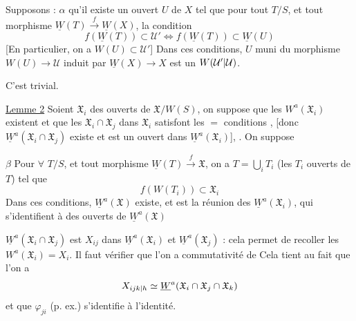 Supposons : \textcircled{$\alpha$} qu'il existe un ouvert $U$ de $X$ tel que pour tout $T/S$, et tout morphisme $\underline W(T)\xrightarrow{f}\underline W(X)$, la condition
\[
f(\underline W(T))\subset\mathcal U'\Longleftrightarrow f(\underline W(T))\subset\underline W(U)
\]
[En particulier, on a $W(U)\subset\mathcal U'$]
Dans ces conditions, $U$ muni du morphisme $W(U)\to\mathcal U$ induit par $\underline W(X)\to X$ est un $W(\mathcal U'|\mathcal U)$.

C'est trivial.


\uline{Lemme 2} Soient $\mathfrak X_i$ des ouverts de $\mathfrak X/W(S)$, on suppose  que  les $W^a(\mathfrak X_i)$ existent  \deleted{)} et que les $\mathfrak X_i\cap\mathfrak X_j$ dans $\mathfrak X_i$ satisfont les $=$ conditions , [donc $\underline W^a(\mathfrak X_i\cap\mathfrak X_j)$ existe\unsure{\}} et est un ouvert dans $\underline W^a(\mathfrak X_i)$], . On suppose

\textcircled{$\beta$} Pour $\forall$ $T/S$, et tout morphisme $\underline W(T)\xrightarrow{f}\mathfrak X$, on a $T=\bigcup_i T_i$ (les $T_i$ ouverts de $T$) tel que
\[
f(W(T_i))\subset\mathfrak X_i
\]
Dans ces conditions, $\underline W^a(\mathfrak X)$ existe, et est la réunion des $\underline W^a(\mathfrak X_i)$, qui s'identifient à des ouverts de $\underline W^a(\mathfrak X)$

$\underline W^a(\mathfrak X_i\cap\mathfrak X_j)$ est     $X_{ij}$ dans $\underline W^a(\mathfrak X_i)$ et  $\underline W^a(\mathfrak X_j)$ : cela permet de recoller les $W^a(\mathfrak X_i)=X_i$. Il faut vérifier que l'on a  commutativité de
Cela tient au fait que l'on a
\[
X_{ijk|h}\simeq\underline W^a(\mathfrak X_i\cap\mathfrak X_j\cap\mathfrak X_k)
\]
et que  $\varphi_{ji}$ (p. ex.) s'identifie à l'identité.

